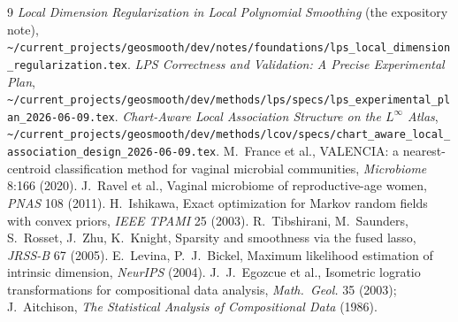 \documentclass[11pt]{article}
\theoremstyle{definition}
\begin{document}
\begin{thebibliography}{9}\small
{} \emph{Local Dimension Regularization in Local Polynomial
  Smoothing} (the expository note),
  \nolinkurl{~/current_projects/geosmooth/dev/notes/foundations/lps_local_dimension_regularization.tex}.
 \emph{LPS Correctness and Validation: A Precise Experimental Plan},
  \nolinkurl{~/current_projects/geosmooth/dev/methods/lps/specs/lps_experimental_plan_2026-06-09.tex}.
 \emph{Chart-Aware Local Association Structure on the
  $L^\infty$ Atlas},
  \nolinkurl{~/current_projects/geosmooth/dev/methods/lcov/specs/chart_aware_local_association_design_2026-06-09.tex}.
 M.~France et al., VALENCIA: a nearest-centroid classification
  method for vaginal microbial communities, \emph{Microbiome} 8:166 (2020).
 J.~Ravel et al., Vaginal microbiome of reproductive-age women,
  \emph{PNAS} 108 (2011).
 H.~Ishikawa, Exact optimization for Markov random fields with
  convex priors, \emph{IEEE TPAMI} 25 (2003).
 R.~Tibshirani, M.~Saunders, S.~Rosset, J.~Zhu, K.~Knight,
  Sparsity and smoothness via the fused lasso, \emph{JRSS-B} 67 (2005).
 E.~Levina, P.~J.~Bickel, Maximum likelihood estimation of
  intrinsic dimension, \emph{NeurIPS} (2004).
 J.~J.~Egozcue et al., Isometric logratio transformations for
  compositional data analysis, \emph{Math.\ Geol.} 35 (2003);
  J.~Aitchison, \emph{The Statistical Analysis of Compositional Data} (1986).
\end{thebibliography}
\end{document}
